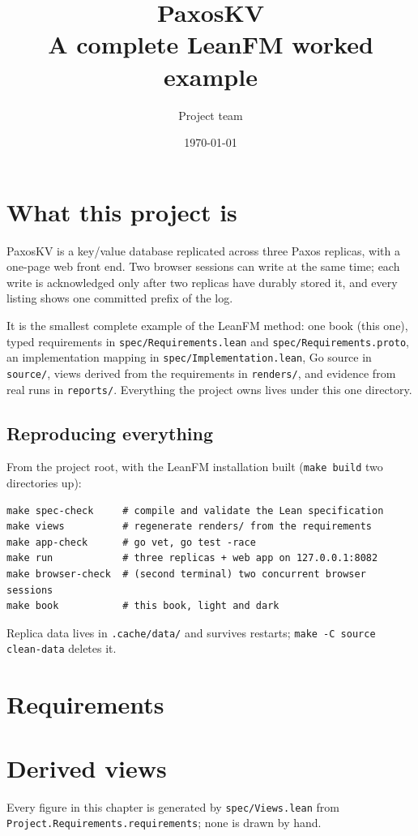 \documentclass[11pt,oneside]{book}
\title{PaxosKV\\[1ex]\large A complete LeanFM worked example}
\author{Project team}
\date{\today}
\begin{document}
\frontmatter
\maketitle
\tableofcontents
\mainmatter

\chapter{What this project is}
PaxosKV is a key/value database replicated across three Paxos replicas, with
a one-page web front end. Two browser sessions can write at the same time;
each write is acknowledged only after two replicas have durably stored it,
and every listing shows one committed prefix of the log.

It is the smallest complete example of the LeanFM method: one book (this
one), typed requirements in \texttt{spec/Requirements.lean} and
\texttt{spec/Requirements.proto}, an implementation mapping in
\texttt{spec/Implementation.lean}, Go source in \texttt{source/}, views
derived from the requirements in \texttt{renders/}, and evidence from real
runs in \texttt{reports/}. Everything the project owns lives under this one
directory.

\section{Reproducing everything}
From the project root, with the LeanFM installation built (\texttt{make build}
two directories up):
\begin{Verbatim}
make spec-check     # compile and validate the Lean specification
make views          # regenerate renders/ from the requirements
make app-check      # go vet, go test -race
make run            # three replicas + web app on 127.0.0.1:8082
make browser-check  # (second terminal) two concurrent browser sessions
make book           # this book, light and dark
\end{Verbatim}
Replica data lives in \texttt{.cache/data/} and survives restarts;
\texttt{make -C source clean-data} deletes it.

\chapter{Requirements}


\chapter{Derived views}
Every figure in this chapter is generated by \texttt{spec/Views.lean} from
\texttt{Project.Requirements.requirements}; none is drawn by hand.
\end{document}
